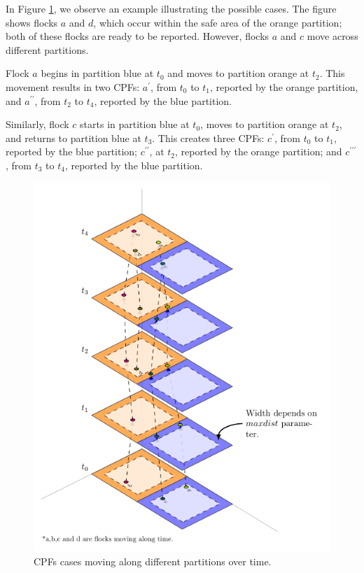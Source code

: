 In Figure \ref{fig:simple_alternative}, we observe an example illustrating the possible cases. The figure shows flocks $a$ and $d$, which occur within the safe area of the orange partition; both of these flocks are ready to be reported. However, flocks $a$ and $c$ move across different partitions. 

Flock $a$ begins in partition blue at $t_0$ and moves to partition orange at $t_2$. This movement results in two CPFs: $a^{\prime}$, from $t_{0}$ to $t_{1}$, reported by the orange partition, and $a^{\prime \prime}$, from $t_{2}$ to $t_{4}$, reported by the blue partition.

Similarly, flock $c$ starts in partition blue at $t_0$, moves to partition orange at $t_2$, and returns to partition blue at $t_3$. This creates three CPFs: $c^{\prime}$, from $t_{0}$ to $t_{1}$, reported by the blue partition; $c^{\prime \prime}$, at $t_2$, reported by the orange partition; and $c^{\prime \prime \prime}$, from $t_{3}$ to $t_{4}$, reported by the blue partition.


\begin{figure}
    \centering
    \includegraphics[height=0.9\textheight]
    {chapterPFlocks/figures/plots/11_temporal_partitions/TemporalPartitioning.pdf}
    \caption{CPFs cases moving along different partitions over time.}\label{fig:simple_alternative}
\end{figure}

